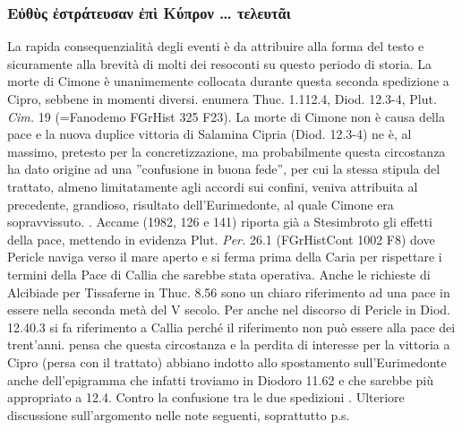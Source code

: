 {            \subsubsection{\textgreek{Εὐθὺς ἐστράτευσαν ἐπὶ Κύπρον … τελευτᾶι}}
            La rapida consequenzialità degli eventi è da attribuire alla forma del testo e sicuramente alla brevità di molti dei resoconti su questo periodo di storia. La morte di  Cimone è unanimemente collocata durante questa seconda spedizione a Cipro, sebbene in momenti diversi. \cite[135 n.22]{Samons1998} enumera Thuc. 1.112.4, Diod. 12.3-4, Plut. \emph{Cim.} 19 (=Fanodemo FGrHist 325 F23). La morte di  Cimone non è causa della pace e la nuova duplice vittoria di Salamina Cipria (Diod. 12.3-4) ne è, al massimo, pretesto per la concretizzazione, ma probabilmente questa circostanza ha dato origine ad una ''confusione in buona fede'', per cui la stessa stipula del trattato, almeno limitatamente agli accordi sui confini, veniva attribuita al precedente, grandioso, risultato dell'Eurimedonte, al quale  Cimone era sopravvissuto.  \cite[115-17]{Cawkwell1997}. Accame (1982, 126 e 141) riporta già a Stesimbroto gli effetti della pace, mettendo in evidenza Plut. \emph{Per.} 26.1 (FGrHistCont 1002 F8) dove Pericle  naviga verso il mare aperto e si ferma prima della Caria per rispettare i termini della Pace di Callia che sarebbe stata operativa. Anche le richieste di Alcibiade per Tissaferne in Thuc. 8.56 sono un chiaro riferimento ad una pace in essere nella seconda metà del V secolo. Per \cite[404]{Parmeggiani2011} anche nel discorso di Pericle  in Diod. 12.40.3 si fa riferimento a Callia perché il riferimento non può essere alla pace dei trent'anni. \cite[148-9]{Accame1982} pensa che questa circostanza e la perdita di interesse per la vittoria a Cipro (persa con il trattato) abbiano indotto allo spostamento sull'Eurimedonte anche dell'epigramma che infatti troviamo in  Diodoro 11.62 e che sarebbe più appropriato a 12.4. Contro la confusione tra le due spedizioni \cite[408]{Parmeggiani2011}. Ulteriore discussione sull'argomento nelle note seguenti, soprattutto p.\pageref{pacedicallia}s.
}
